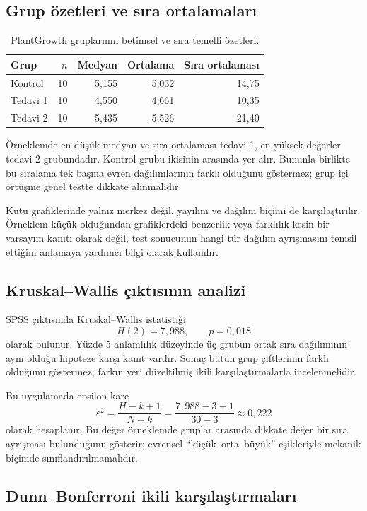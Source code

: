 \subsection{Grup özetleri ve sıra ortalamaları}

\begin{table}[htbp]
\centering
\caption{PlantGrowth gruplarının betimsel ve sıra temelli özetleri.}
\begin{tabular}{@{}lrrrr@{}}
\toprule
Grup & $n$ & Medyan & Ortalama & Sıra ortalaması \\
\midrule
Kontrol & 10 & 5,155 & 5,032 & 14,75 \\
Tedavi 1 & 10 & 4,550 & 4,661 & 10,35 \\
Tedavi 2 & 10 & 5,435 & 5,526 & 21,40 \\
\bottomrule
\end{tabular}
\end{table}

Örneklemde en düşük medyan ve sıra ortalaması tedavi 1, en yüksek değerler
tedavi 2 grubundadır. Kontrol grubu ikisinin arasında yer alır. Bununla
birlikte bu sıralama tek başına evren dağılımlarının farklı olduğunu
göstermez; grup içi örtüşme genel testte dikkate alınmalıdır.

Kutu grafiklerinde yalnız merkez değil, yayılım ve dağılım biçimi de
karşılaştırılır. Örneklem küçük olduğundan grafiklerdeki benzerlik veya
farklılık kesin bir varsayım kanıtı olarak değil, test sonucunun hangi tür
dağılım ayrışmasını temsil ettiğini anlamaya yardımcı bilgi olarak kullanılır.

\subsection{Kruskal--Wallis çıktısının analizi}

SPSS çıktısında Kruskal--Wallis istatistiği
\[
H(2)=7{,}988,
\qquad p=0{,}018
\]
olarak bulunur. Yüzde 5 anlamlılık düzeyinde üç grubun ortak sıra dağılımının
aynı olduğu hipoteze karşı kanıt vardır. Sonuç bütün grup çiftlerinin farklı
olduğunu göstermez; farkın yeri düzeltilmiş ikili karşılaştırmalarla
incelenmelidir.

Bu uygulamada epsilon-kare
\[
\varepsilon^2
=\frac{H-k+1}{N-k}
=\frac{7{,}988-3+1}{30-3}
\approx0{,}222
\]
olarak hesaplanır. Bu değer örneklemde gruplar arasında dikkate değer bir sıra
ayrışması bulunduğunu gösterir; evrensel ``küçük--orta--büyük'' eşikleriyle
mekanik biçimde sınıflandırılmamalıdır.

\subsection{Dunn--Bonferroni ikili karşılaştırmaları}

